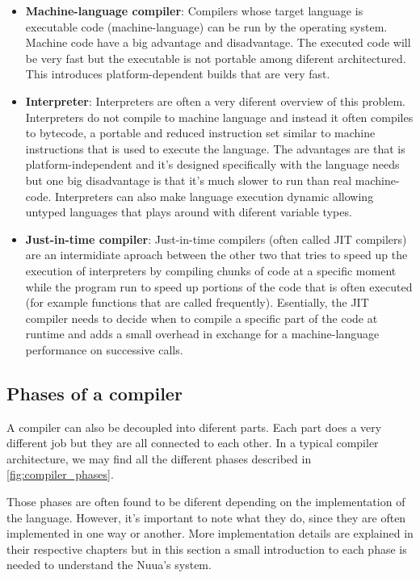 \begin{itemize}
    \item \textbf{Machine-language compiler}: Compilers whose target language is executable code (machine-language) can be run
        by the operating system. Machine code have a big advantage and disadvantage. The executed code will be very fast but the
        executable is not portable among diferent architectured. This introduces platform-dependent builds that are very fast.
    \item \textbf{Interpreter}: Interpreters are often a very diferent overview of this problem. Interpreters do not compile
        to machine language and instead it often compiles to bytecode, a portable and reduced instruction set similar to machine instructions
        that is used to execute the language. The advantages are that is platform-independent and it's designed specifically with the language
        needs but one big disadvantage is that it's much slower to run than real machine-code. Interpreters can also make language execution
        dynamic allowing untyped languages that plays around with diferent variable types.
    \item \textbf{Just-in-time compiler}: Just-in-time compilers (often called JIT compilers) are an intermidiate aproach between the other two
        that tries to speed up the execution of interpreters by compiling chunks of code at a specific moment while the program run to speed up portions
        of the code that is often executed (for example functions that are called frequently). Esentially, the JIT compiler needs to decide when to compile
        a specific part of the code at runtime and adds a small overhead in exchange for a machine-language performance on successive calls.
\end{itemize}

\subsection{Phases of a compiler}

A compiler can also be decoupled into diferent parts. Each part does a very different job but they are all connected to each other.
In a typical compiler architecture, we may find all the different phases described in \autoref{fig:compiler_phases}.

Those phases are often found to be diferent depending on the implementation of the language. However, it's important to note what they do,
since they are often implemented in one way or another. More implementation details are explained in their respective chapters but in this
section a small introduction to each phase is needed to understand the Nuua's system.

